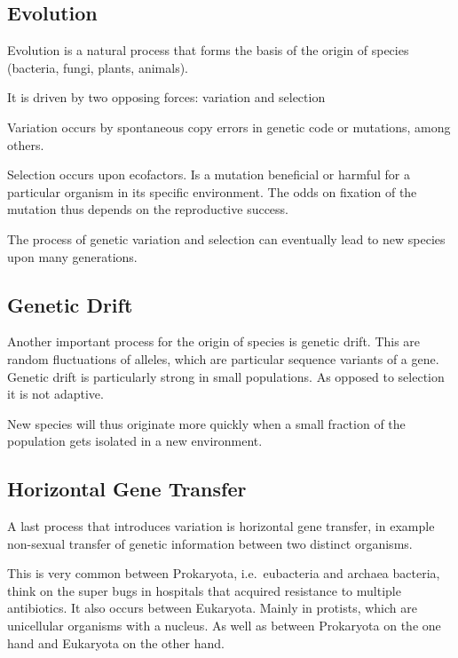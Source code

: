 \documentclass[
  11pt,
]{book}
\begin{document}
\hypertarget{evolution-1}{%
\subsection{Evolution}\label{evolution-1}}

Evolution is a natural process that forms the basis of the origin of species (bacteria, fungi, plants, animals).

It is driven by two opposing forces: variation and selection

Variation occurs by spontaneous copy errors in genetic code or mutations, among others.

Selection occurs upon ecofactors. Is a mutation beneficial or harmful for a particular organism in its specific environment.
The odds on fixation of the mutation thus depends on the reproductive success.

The process of genetic variation and selection can eventually lead to new species upon many generations.

\hypertarget{genetic-drift}{%
\subsection{Genetic Drift}\label{genetic-drift}}

Another important process for the origin of species is genetic drift. This are random fluctuations of alleles, which are particular sequence variants of a gene. Genetic drift is particularly strong in small populations. As opposed to selection it is not adaptive.

New species will thus originate more quickly when a small fraction of the population gets isolated in a new environment.

\hypertarget{horizontal-gene-transfer}{%
\subsection{Horizontal Gene Transfer}\label{horizontal-gene-transfer}}

A last process that introduces variation is horizontal gene transfer, in example non-sexual transfer of genetic information between two distinct organisms.

This is very common between Prokaryota, i.e.~eubacteria and archaea bacteria, think on the super bugs in hospitals that acquired resistance to multiple antibiotics. It also occurs between Eukaryota. Mainly in protists, which are unicellular organisms with a nucleus. As well as between Prokaryota on the one hand and Eukaryota on the other hand.
\end{document}
